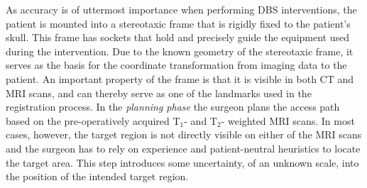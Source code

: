 \documentclass{vgtc}                          %
\begin{document}
As accuracy is of uttermost importance when performing DBS interventions, the patient is mounted into a stereotaxic frame that is rigidly fixed to the patient's skull. This frame has sockets that hold and precisely guide the equipment used during the intervention. Due to the known geometry of the stereotaxic frame, it serves as the basis for the coordinate transformation from imaging data to the patient. An important property of the frame is that it is visible in both CT and MRI scans, and can thereby serve as one of the landmarks used in the registration process. In the \emph{planning phase} the surgeon plans the access path based on the pre-operatively acquired T$_1$- and T$_2$- weighted MRI scans. In most cases, however, the target region is not directly visible on either of the MRI scans and the surgeon has to rely on experience and patient-neutral heuristics to locate the target area. This step introduces some uncertainty, of an unknown scale, into the position of the intended target region. %

\end{document}
